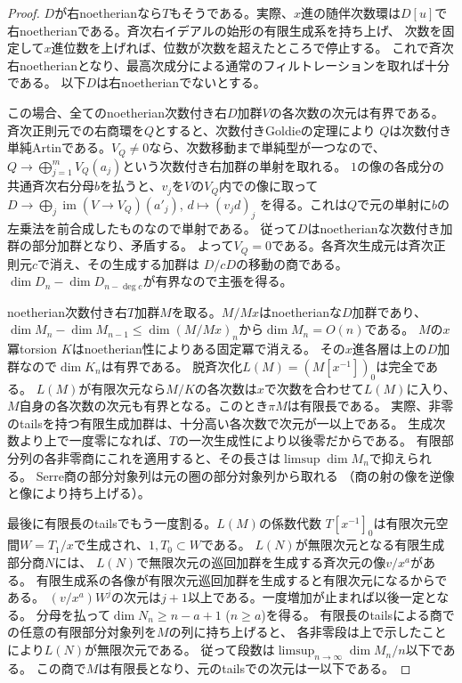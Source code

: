 \documentclass[11pt,a4paper]{ltjsarticle}
\theoremstyle{definition}
\begin{document}
\begin{proof}
$D$が右noetherianなら$T$もそうである。実際、$x$進の随伴次数環は$D[u]$で
右noetherianである。斉次右イデアルの始形の有限生成系を持ち上げ、
次数を固定して$x$進位数を上げれば、位数が次数を超えたところで停止する。
これで斉次右noetherianとなり、最高次成分による通常のフィルトレーションを取れば十分である。
以下$D$は右noetherianでないとする。

この場合、全てのnoetherian次数付き右$D$加群$V$の各次数の次元は有界である。
斉次正則元での右商環を$Q$とすると、次数付きGoldieの定理により
$Q$は次数付き単純Artinである。$V_Q\ne0$なら、次数移動まで単純型が一つなので、
$Q\to\bigoplus_{j=1}^m V_Q(a_j)$という次数付き右加群の単射を取れる。
$1$の像の各成分の共通斉次右分母$b$を払うと、$v_j$を$V$の$V_Q$内での像に取って
$D\to\bigoplus_j\operatorname{im}(V\to V_Q)(a'_j)$, $d\mapsto(v_jd)_j$
を得る。これは$Q$で元の単射に$b$の左乗法を前合成したものなので単射である。
従って$D$はnoetherianな次数付き加群の部分加群となり、矛盾する。
よって$V_Q=0$である。各斉次生成元は斉次正則元$c$で消え、その生成する加群は
$D/cD$の移動の商である。$\dim D_n-\dim D_{n-\deg c}$が有界なので主張を得る。

noetherian次数付き右$T$加群$M$を取る。$M/Mx$はnoetherianな$D$加群であり、
$\dim M_n-\dim M_{n-1}\le\dim(M/Mx)_n$から$\dim M_n=O(n)$である。
$M$の$x$冪torsion $K$はnoetherian性によりある固定冪で消える。
その$x$進各層は上の$D$加群なので$\dim K_n$は有界である。
脱斉次化$L(M)=(M[x^{-1}])_0$は完全である。
$L(M)$が有限次元なら$M/K$の各次数は$x$で次数を合わせて$L(M)$に入り、
$M$自身の各次数の次元も有界となる。このとき$\pi M$は有限長である。
実際、非零のtailsを持つ有限生成加群は、十分高い各次数で次元が一以上である。
生成次数より上で一度零になれば、$T$の一次生成性により以後零だからである。
有限部分列の各非零商にこれを適用すると、その長さは$\limsup\dim M_n$で抑えられる。
Serre商の部分対象列は元の圏の部分対象列から取れる
（商の射の像を逆像と像により持ち上げる）。

最後に有限長のtailsでもう一度割る。$L(M)$の係数代数
$T[x^{-1}]_0$は有限次元空間$W=T_1/x$で生成され、$1,T_0\subset W$である。
$L(N)$が無限次元となる有限生成部分商$N$には、
$L(N)$で無限次元の巡回加群を生成する斉次元の像$v/x^a$がある。
有限生成系の各像が有限次元巡回加群を生成すると有限次元になるからである。
$(v/x^a)W^j$の次元は$j+1$以上である。一度増加が止まれば以後一定となる。
分母を払って$\dim N_n\ge n-a+1$ ($n\ge a$)を得る。
有限長のtailsによる商での任意の有限部分対象列を$M$の列に持ち上げると、
各非零段は上で示したことにより$L(N)$が無限次元である。
従って段数は$\limsup_{n\to\infty}\dim M_n/n$以下である。
この商で$M$は有限長となり、元のtailsでの次元は一以下である。
\end{proof}
\end{document}
